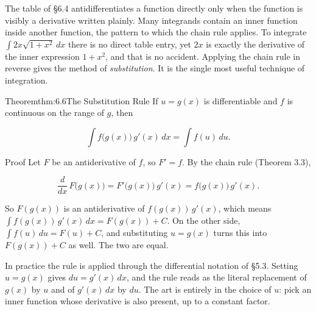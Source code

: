\documentclass[a4paper,12pt,oneside]{memoir}
\begin{document}
The table of §6.4 antidifferentiates a function directly only when the function is visibly a derivative written plainly. Many integrands contain an inner function inside another function, the pattern to which the chain rule applies. To integrate \(\int 2x\sqrt{1 + x^{2}}\,dx\) there is no direct table entry, yet \(2x\) is exactly the derivative of the inner expression \(1 + x^{2}\), and that is no accident. Applying the chain rule in reverse gives the method of \emph{substitution}. It is the single most useful technique of integration.

\begin{envtheorem}{Theorem}{thm:6.6}{The Substitution Rule}
If \(u = g(x)\) is differentiable and \(f\) is continuous on the range of \(g\), then

\[ \int f\bigl(g(x)\bigr)\,g'(x)\,dx = \int f(u)\,du. \]
\end{envtheorem}
\begin{envproof}{Proof}{}{}
Let \(F\) be an antiderivative of \(f\), so \(F' = f\). By the chain rule (Theorem 3.3),

\[ \frac{d}{dx}\,F\bigl(g(x)\bigr) = F'\bigl(g(x)\bigr)\,g'(x) = f\bigl(g(x)\bigr)\,g'(x). \]

So \(F(g(x))\) is an antiderivative of \(f(g(x))\,g'(x)\), which means \(\int f(g(x))\,g'(x)\,dx = F(g(x)) + C\). On the other side, \(\int f(u)\,du = F(u) + C\), and substituting \(u = g(x)\) turns this into \(F(g(x)) + C\) as well. The two are equal. \qedmark
\end{envproof}
In practice the rule is applied through the differential notation of §5.3. Setting \(u = g(x)\) gives \(du = g'(x)\,dx\), and the rule reads as the literal replacement of \(g(x)\) by \(u\) and of \(g'(x)\,dx\) by \(du\). The art is entirely in the choice of \(u\): pick an inner function whose derivative is also present, up to a constant factor.
\end{document}
